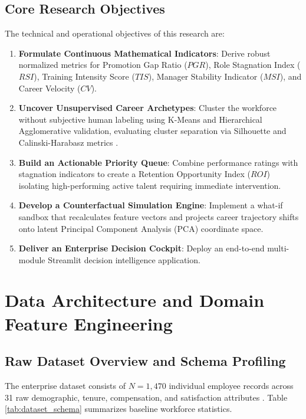 \documentclass[12pt,a4paper,oneside]{article}
\begin{document}
\subsection{Core Research Objectives}
The technical and operational objectives of this research are:
\begin{enumerate}
  \item \textbf{Formulate Continuous Mathematical Indicators}: Derive robust normalized metrics for Promotion Gap Ratio ($PGR$), Role Stagnation Index ($RSI$), Training Intensity Score ($TIS$), Manager Stability Indicator ($MSI$), and Career Velocity ($CV$).
  \item \textbf{Uncover Unsupervised Career Archetypes}: Cluster the workforce without subjective human labeling using K-Means and Hierarchical Agglomerative validation, evaluating cluster separation via Silhouette and Calinski-Harabasz metrics \cite{ref_macqueen_kmeans}.
  \item \textbf{Build an Actionable Priority Queue}: Combine performance ratings with stagnation indicators to create a Retention Opportunity Index ($ROI$) isolating high-performing active talent requiring immediate intervention.
  \item \textbf{Develop a Counterfactual Simulation Engine}: Implement a what-if sandbox that recalculates feature vectors and projects career trajectory shifts onto latent Principal Component Analysis (PCA) coordinate space.
  \item \textbf{Deliver an Enterprise Decision Cockpit}: Deploy an end-to-end multi-module Streamlit decision intelligence application.
\end{enumerate}

\section{Data Architecture and Domain Feature Engineering}

\subsection{Raw Dataset Overview and Schema Profiling}
The enterprise dataset consists of $N = 1,470$ individual employee records across 31 raw demographic, tenure, compensation, and satisfaction attributes \cite{ref_pedregosa_sklearn}. Table \ref{tab:dataset_schema} summarizes baseline workforce statistics.
\end{document}
